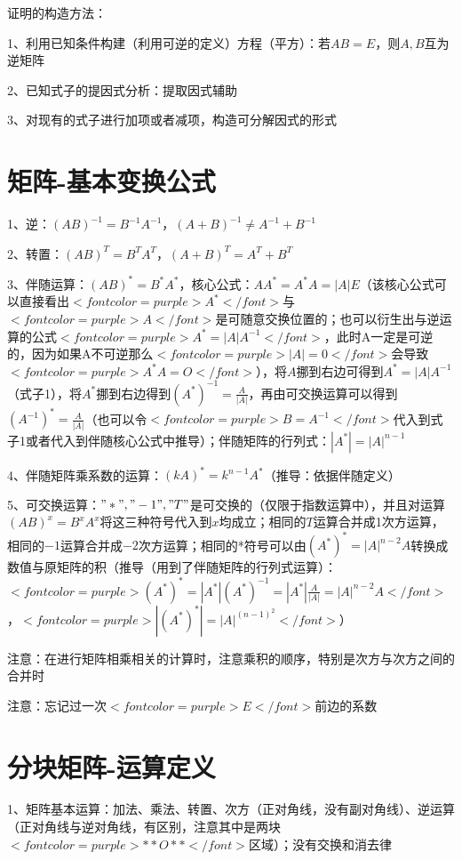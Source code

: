 证明的构造方法：

1、利用已知条件构建（利用可逆的定义）方程（平方）：若$ AB=E $，则$ A,B $互为逆矩阵

2、已知式子的提因式分析：提取因式辅助

3、对现有的式子进行加项或者减项，构造可分解因式的形式

\section{矩阵-基本变换公式}

1、逆：$ (AB)^{-1}=B^{-1} A^{-1} $，$ (A+B)^{-1}\ne A^{-1} + B^{-1} $

2、转置：$ (AB)^T=B^TA^T $，$ (A+B)^T=A^T + B^T $

3、伴随运算：$ (AB)^*=B^*A^* $，核心公式：$ AA^*=A^*A=|A|E $（该核心公式可以直接看出$ <font color=purple>A^*</font> $与$ <font color=purple>A</font> $是可随意交换位置的；也可以衍生出与逆运算的公式$ <font color=purple>A^*=|A|A^{-1}</font> $，此时A一定是可逆的，因为如果A不可逆那么$ <font color=purple>|A|=0</font> $会导致$ <font color=purple>A^*A=O</font> $），将$ A $挪到右边可得到$ A^*=|A|A^{-1} $（式子1），将$ A^* $挪到右边得到$ (A^*)^{-1}=\frac{A}{|A|} $，再由可交换运算可以得到$ (A^{-1})^*=\frac{A}{|A|} $（也可以令$ <font color=purple>B=A^{-1}</font> $代入到式子1或者代入到伴随核心公式中推导）；伴随矩阵的行列式：$ |A^*|=|A|^{n-1} $

4、伴随矩阵乘系数的运算：$ (kA)^*=k^{n-1}A^* $（推导：依据伴随定义）

5、可交换运算：$ "*","-1","T" $是可交换的（仅限于指数运算中），并且对运算$ (AB)^x=B^xA^x $将这三种符号代入到$ x $均成立；相同的$ T $运算合并成1次方运算，相同的$ -1 $运算合并成$ -2 $次方运算；相同的*符号可以由$ (A^*)^{*}=|A|^{n-2}A $转换成数值与原矩阵的积（推导（用到了伴随矩阵的行列式运算）：$ <font color=purple>(A^*)^{*}=|A^*|(A^*)^{-1}=|A^*|\frac{A}{|A|}=|A|^{n-2}A</font> $，$ <font color=purple>|(A^*)^{*}|=|A|^{(n-1)^2}</font> $）

注意：在进行矩阵相乘相关的计算时，注意乘积的顺序，特别是次方与次方之间的合并时

注意：忘记过一次$ <font color=purple>E</font> $前边的系数

\section{分块矩阵-运算定义}

1、矩阵基本运算：加法、乘法、转置、次方（正对角线，没有副对角线）、逆运算（正对角线与逆对角线，有区别，注意其中是两块$ <font color=purple>**O**</font> $区域）；没有交换和消去律

